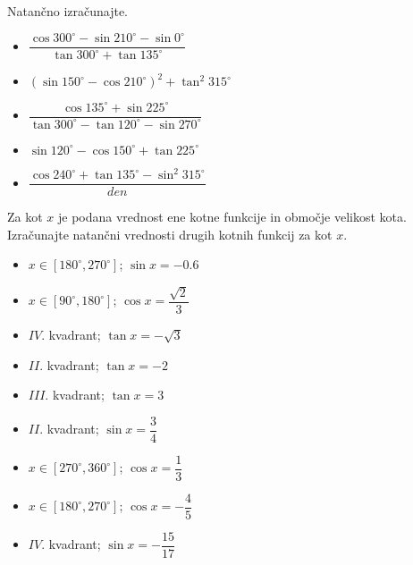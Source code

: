         


        
            \begin{naloga}
                Natančno izračunajte.
                \begin{itemize}
                    
                            \item $\displaystyle \dfrac{\cos{300^\circ}-\sin{210^\circ}-\sin{0^\circ}}{\tan{300^\circ}+\tan{135^\circ}} $ 
                            \item $\displaystyle \left(\sin{150^\circ}-\cos{210^\circ}\right)^2+\tan^2{315^\circ} $ 
                            \item $\displaystyle \dfrac{\cos{135^\circ}+\sin{225^\circ}}{\tan{300^\circ}-\tan{120^\circ}-\sin{270^\circ}} $ 
                            \item $\displaystyle \sin{120^\circ}-\cos{150^\circ}+\tan{225^\circ} $ 
                            \item $\displaystyle \dfrac{\cos{240^\circ}+\tan{135^\circ}-\sin^2{315^\circ}}{den} $ 
                    
                \end{itemize}
            \end{naloga}

        

        
        
            \begin{naloga}
                Za kot $x$ je podana vrednost ene kotne funkcije in območje velikost kota.
                Izračunajte natančni vrednosti drugih kotnih funkcij za kot $x$.
                \begin{itemize}
                    
                            \item $x\in[180^\circ,270^\circ]$; $\sin{x}=-0.6 $ 
                            \item $x\in[90^\circ,180^\circ]$; $\cos{x}=\dfrac{\sqrt{2}}{3}$ 
                            \item $IV.$ kvadrant; $\tan{x}=-\sqrt{3} $ 
                            \item $II.$ kvadrant; $\tan{x}=-2 $ 
                            \item $III.$ kvadrant; $\tan{x}=3 $ 
                            \item $II.$ kvadrant; $\sin{x}=\dfrac{3}{4} $ 
                            \item $x\in[270^\circ,360^\circ]$; $\cos{x}=\dfrac{1}{3}$ 
                            \item $x\in[180^\circ,270^\circ]$; $\cos{x}=-\dfrac{4}{5}$ 
                            \item $IV.$ kvadrant; $\sin{x}=-\dfrac{15}{17} $ 
                    
                \end{itemize}
            \end{naloga}

